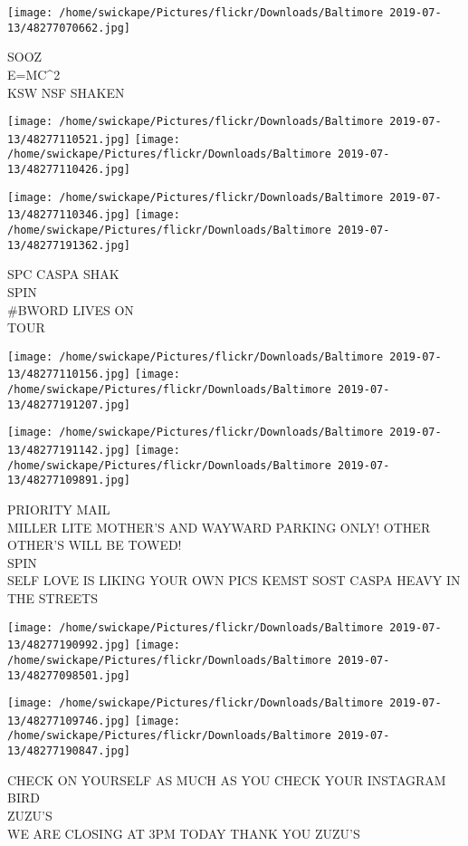 \documentclass[10pt,letterpaper]{article}
\begin{document}
\vspace{0.25in}
\texttt{[image: /home/swickape/Pictures/flickr/Downloads/Baltimore 2019-07-13/48277070662.jpg]}

SOOZ\\
E=MC\^{}2\\
KSW NSF SHAKEN
\pagebreak

\texttt{[image: /home/swickape/Pictures/flickr/Downloads/Baltimore 2019-07-13/48277110521.jpg]}
\texttt{[image: /home/swickape/Pictures/flickr/Downloads/Baltimore 2019-07-13/48277110426.jpg]}

\texttt{[image: /home/swickape/Pictures/flickr/Downloads/Baltimore 2019-07-13/48277110346.jpg]}
\texttt{[image: /home/swickape/Pictures/flickr/Downloads/Baltimore 2019-07-13/48277191362.jpg]}

SPC CASPA SHAK\\
SPIN\\
\#BWORD LIVES ON\\
TOUR
\pagebreak

\texttt{[image: /home/swickape/Pictures/flickr/Downloads/Baltimore 2019-07-13/48277110156.jpg]}
\texttt{[image: /home/swickape/Pictures/flickr/Downloads/Baltimore 2019-07-13/48277191207.jpg]}

\texttt{[image: /home/swickape/Pictures/flickr/Downloads/Baltimore 2019-07-13/48277191142.jpg]}
\texttt{[image: /home/swickape/Pictures/flickr/Downloads/Baltimore 2019-07-13/48277109891.jpg]}

PRIORITY MAIL\\
MILLER LITE MOTHER'S AND WAYWARD PARKING ONLY!  OTHER OTHER'S WILL BE TOWED!\\
SPIN\\
SELF LOVE IS LIKING YOUR OWN PICS KEMST SOST CASPA HEAVY IN THE STREETS
\pagebreak

\texttt{[image: /home/swickape/Pictures/flickr/Downloads/Baltimore 2019-07-13/48277190992.jpg]}
\texttt{[image: /home/swickape/Pictures/flickr/Downloads/Baltimore 2019-07-13/48277098501.jpg]}

\texttt{[image: /home/swickape/Pictures/flickr/Downloads/Baltimore 2019-07-13/48277109746.jpg]}
\texttt{[image: /home/swickape/Pictures/flickr/Downloads/Baltimore 2019-07-13/48277190847.jpg]}

CHECK ON YOURSELF AS MUCH AS YOU CHECK YOUR INSTAGRAM\\
BIRD\\
ZUZU'S\\
WE ARE CLOSING AT 3PM TODAY THANK YOU ZUZU'S
\pagebreak
\end{document}
